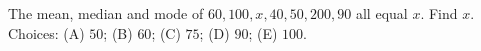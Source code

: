 The mean, median and mode of $60,100,x,40,50,200,90$ all equal $x$. Find $x$. Choices: (A) $50$; (B) $60$; (C) $75$; (D) $90$; (E) $100$.
